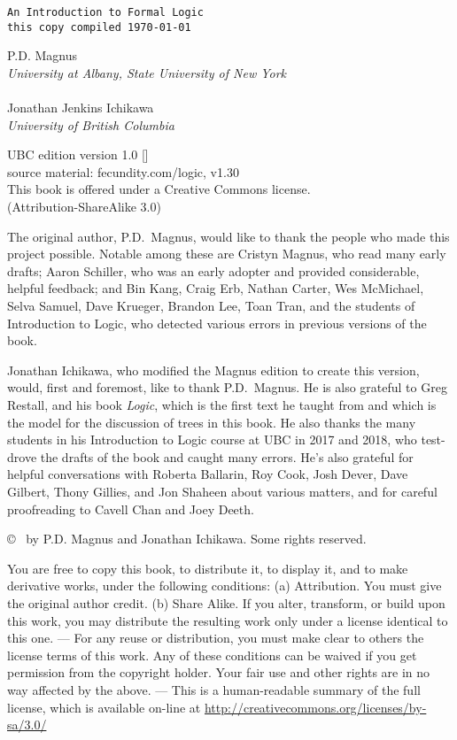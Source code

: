 \thispagestyle{empty}
{\Huge\forallx}

{\tt An Introduction to Formal Logic\\
this copy compiled \today}
\vfill


{\sf P.D. Magnus}\\
\emph{University at Albany, State University of New York}\\
\\
{\sf Jonathan Jenkins Ichikawa}\\
\emph{University of British Columbia}



\vfill




{\sf
	UBC edition version 1.0 [\bookversion]\\
	source material: fecundity.com/logic, v1.30\\
	This book is offered under a Creative Commons license.\\
	(Attribution-ShareAlike 3.0)
}



\newpage
\thispagestyle{empty}%
{\sf
The original author, P.D.\ Magnus, would like to thank the people who made this project possible. Notable among these are Cristyn Magnus, who read many early drafts; Aaron Schiller, who was an early adopter and provided considerable, helpful feedback; {and} Bin Kang, Craig Erb, Nathan Carter, Wes McMichael, Selva Samuel,  Dave Krueger, Brandon Lee, Toan Tran, and the students of Introduction to Logic, who detected various errors in previous versions of the book.

Jonathan Ichikawa, who modified the Magnus edition to create this version, would, first and foremost, like to thank P.D.\ Magnus. He is also grateful to Greg Restall, and his book \emph{Logic}, which is the first text he taught from and which is the model for the discussion of trees in this book. He also thanks the many students in his Introduction to Logic course at UBC in 2017 and 2018, who test-drove the drafts of the book and caught many errors. He's also grateful for helpful conversations with Roberta Ballarin, Roy Cook, Josh Dever, Dave Gilbert, Thony Gillies, and Jon Shaheen about various matters, and for careful proofreading to Cavell Chan and Joey Deeth.

}

\vfill
{
\copyright\  by P.D. Magnus and Jonathan Ichikawa. Some rights reserved.
}

{\footnotesize
You are free to copy this book, to distribute it, to display it, and to make derivative works, under the following conditions: (a) Attribution. You must give the original author credit. (b) Share Alike. If you alter, transform, or build upon this work, you may distribute the resulting work only under a license identical to this one. --- For any reuse or distribution, you must make clear to others the license terms of this work. Any of these conditions can be waived if you get permission from the copyright holder. Your fair use and other rights are in no way affected by the above. --- This is a human-readable summary of the full license, which is available on-line at \url{http://creativecommons.org/licenses/by-sa/3.0/}
}

